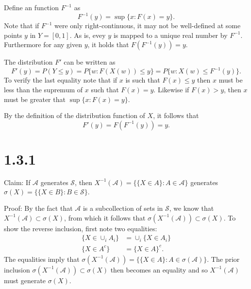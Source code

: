 \documentclass[10pt]{article}
\begin{document}
  Define an function $F^{-1}$ as
  \begin{equation*}
    F^{-1}(y) = \sup\{x: F(x) = y\}.
  \end{equation*}
  Note that if $F^{-1}$ were only right-continuous, it may 
  not be well-defined at some points $y$ in $Y = [0,1]$. 
  As is, evey $y$ is mapped to a unique real number by $F^{-1}$. 
  Furthermore for any given $y$, it holds that $F(F^{-1}(y)) = y$.
  
  The distribution $F'$ can be written as
  \begin{equation*}
    F'(y) = P(Y \le y) = P\{w: F(X(w)) \le y\}
      = P\{w: X(w) \le F^{-1}(y)\}.
  \end{equation*}
  To verify the last equality note that if $x$ is such that
  $F(x) \le y$ then $x$ must be less than the supremum
  of $x$ such that $F(x)=y$. Likewise if $F(x) > y$,
  then $x$ must be greater that $\sup\{x: F(x) = y\}$.

  By the definition of the distribution function of $X$,
  it follows that 
  \begin{equation*}
    F'(y) = F(F^{-1}(y)) = y.
  \end{equation*}

\section*{1.3.1}
  Claim: If $\mathcal{A}$ generates $\mathcal{S}$, 
  then $X^{-1}(\mathcal{A}) = \{\{X \in A\} : A \in \mathcal{A}\}$
  generates $\sigma(X) = \{\{X \in B\} : B \in \mathcal{S}\}$.

  Proof: By the fact that $\mathcal{A}$ is a subcollection of sets
  in $\mathcal{S}$, we know that $X^{-1}(\mathcal{A}) \subset \sigma(X)$,
  from which it follows that $\sigma(X^{-1}(\mathcal{A})) \subset \sigma(X)$.
  To show the reverse inclusion, first note two equalities:
  \begin{equation*}
    \begin{aligned}
      \{X \in \cup_i A_i\} & = \cup_i \{X \in A_i\} \\
      \{X \in A^c\} & = \{X \in A\}^c.
    \end{aligned}
  \end{equation*}
  The equalities imply that $\sigma(X^{-1}(\mathcal{A}))
  = \{\{X \in A\} : A \in \sigma(\mathcal{A})\}$.
  The prior inclusion $\sigma(X^{-1}(\mathcal{A})) \subset \sigma(X)$
  then becomes an equality and so
  $X^{-1}(\mathcal{A})$ must generate $\sigma(X)$.
\end{document}
